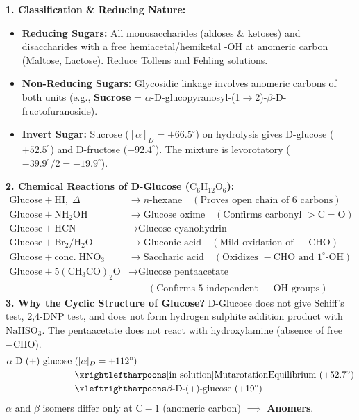 \documentclass[10pt,twoside,openright]{book}
\begin{document}
\begin{formulabox}
\textbf{1. Classification \& Reducing Nature:}
\begin{itemize}
  \item \textbf{Reducing Sugars:} All monosaccharides (aldoses \& ketoses) and disaccharides with a free hemiacetal/hemiketal -OH at anomeric carbon (Maltose, Lactose). Reduce Tollens and Fehling solutions.
  \item \textbf{Non-Reducing Sugars:} Glycosidic linkage involves anomeric carbons of both units (e.g., \textbf{Sucrose} = $\alpha$-D-glucopyranosyl-(1$\to$2)-$\beta$-D-fructofuranoside).
  \item \textbf{Invert Sugar:} Sucrose ($[\alpha]_D = +66.5^\circ$) on hydrolysis gives D-glucose ($+52.5^\circ$) and D-fructose ($-92.4^\circ$). The mixture is levorotatory ($-39.9^\circ / 2 = -19.9^\circ$).
\end{itemize}
\textbf{2. Chemical Reactions of D-Glucose ($\mathrm{C_6H_{12}O_6}$):}
\begin{align*}
  \mathrm{Glucose} + \mathrm{HI},\; \Delta &\longrightarrow n\text{-hexane} \quad (\text{Proves open chain of 6 carbons})\\
  \mathrm{Glucose} + \mathrm{NH_2OH} &\longrightarrow \text{Glucose oxime} \quad (\text{Confirms carbonyl } >\mathrm{C=O})\\
  \mathrm{Glucose} + \mathrm{HCN} &\longrightarrow \text{Glucose cyanohydrin}\\
  \mathrm{Glucose} + \mathrm{Br_2 / H_2O} &\longrightarrow \text{Gluconic acid} \quad (\text{Mild oxidation of } -\mathrm{CHO})\\
  \mathrm{Glucose} + \mathrm{conc.\; HNO_3} &\longrightarrow \text{Saccharic acid} \quad (\text{Oxidizes } -\mathrm{CHO} \text{ and } 1^\circ\text{-OH})\\
  \mathrm{Glucose} + 5(\mathrm{CH_3CO})_2\mathrm{O} &\longrightarrow \text{Glucose pentaacetate} \\
  &\qquad (\text{Confirms 5 independent } -\mathrm{OH} \text{ groups})
\end{align*}
\textbf{3. Why the Cyclic Structure of Glucose?}
D-Glucose does not give Schiff's test, 2,4-DNP test, and does not form hydrogen sulphite addition product with $\mathrm{NaHSO}_3$. The pentaacetate does not react with hydroxylamine (absence of free $-\mathrm{CHO}$).
\begin{align}
  \alpha\text{-D-(+)-glucose } &([\alpha]_D = +112^\circ) \nonumber\\
  &\xrightleftharpoons[\text{in solution}]{\text{Mutarotation}} \text{Equilibrium } (+52.7^\circ) \nonumber\\
  &\xleftrightharpoons \beta\text{-D-(+)-glucose } (+19^\circ)
\end{align}
$\alpha$ and $\beta$ isomers differ only at $\mathrm{C-1}$ (anomeric carbon) $\implies$ \textbf{Anomers}.
\end{formulabox}
\end{document}

